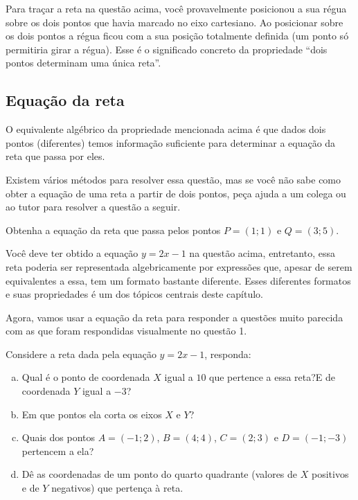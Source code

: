\documentclass[main_estudante.tex]{subfiles}
\begin{document}
Para traçar a reta na questão acima, você provavelmente posicionou a sua régua sobre os dois pontos que havia marcado no eixo cartesiano. Ao posicionar sobre os dois pontos a régua ficou com a sua posição totalmente definida (um ponto só permitiria girar a régua). Esse é o significado concreto da propriedade ``dois pontos determinam uma única reta''.

\subsection*{Equação da reta}

O equivalente algébrico da propriedade mencionada acima é que dados dois pontos (diferentes) temos informação suficiente para determinar a equação da reta que passa por eles. 

Existem vários métodos para resolver essa questão, mas se você não sabe como obter a equação de uma reta a partir de dois pontos, peça ajuda a um colega ou ao tutor para resolver a questão a seguir.

\begin{questao}
Obtenha a equação da reta que passa pelos pontos $P=(1;1)$ e $Q=(3;5)$.
\end{questao}

Você deve ter obtido a equação $y=2x-1$ na questão acima, entretanto, essa reta poderia ser representada algebricamente por expressões que, apesar de serem equivalentes a essa, tem um formato bastante diferente. Esses diferentes formatos e suas propriedades é um dos tópicos centrais deste capítulo.

Agora, vamos usar a equação da reta para responder a questões muito parecida com as que foram respondidas visualmente no questão 1.

\begin{questao}
Considere a reta dada pela equação $y=2x-1$, responda:
\begin{enumerate}[a)]
\item Qual é o ponto de coordenada $X$ igual a $10$ que pertence a essa reta?E de coordenada $Y$ igual a $-3$?
\item Em que pontos ela corta os eixos $X$ e $Y$?
\item Quais dos pontos $A=(-1;2)$, $B=(4;4)$, $C=(2;3)$ e $D=(-1;-3)$ pertencem a ela? 
\item Dê as coordenadas de um ponto do quarto quadrante (valores de $X$ positivos e de $Y$ negativos) que pertença à reta.
\end{enumerate} 
\end{questao}
\end{document}
